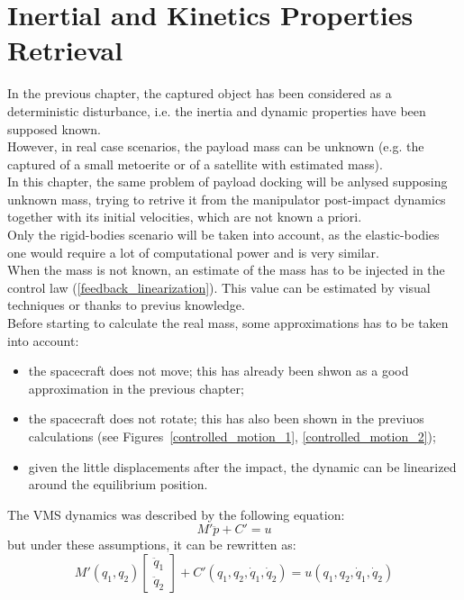 \documentclass[a4paper,12pt,oneside]{report}
\begin{document}
\chapter{Inertial and Kinetics Properties Retrieval}
In the previous chapter, the captured object has been considered as a deterministic disturbance, i.e. the inertia and dynamic properties have been supposed known.\\
However, in real case scenarios, the payload mass can be unknown (e.g. the captured of a small metoerite or of a satellite with estimated mass).\\
In this chapter, the same problem of payload docking will be anlysed supposing unknown mass, trying to retrive it from the manipulator post-impact dynamics together with its initial velocities, which are not known a priori.\\
Only the rigid-bodies scenario will be taken into account, as the elastic-bodies one would require a lot of computational power and is very similar.\\
When the mass is not known, an estimate of the mass has to be injected in the control law (\ref{feedback_linearization}). This value can be estimated by visual techniques or thanks to previus knowledge.\\
Before starting to calculate the real mass, some approximations has to be taken into account:
\begin{itemize}
  \item the spacecraft does not move; this has already been shwon as a good approximation in the previous chapter;
  \item the spacecraft does not rotate; this has also been shown in the previuos calculations (see Figures~\ref{controlled_motion_1}, \ref{controlled_motion_2});
  \item given the little displacements after the impact, the dynamic can be linearized around the equilibrium position.
\end{itemize}
The VMS dynamics was described by the following equation:
\begin{equation}
  M'\ddot{p}+C'=u
\end{equation}
but under these assumptions, it can be rewritten as:
\begin{equation}
  M'(q_1,q_2)\begin{bmatrix}
    \ddot{q}_1\\
    \ddot{q}_2
  \end{bmatrix}+C'(q_1,q_2,\dot{q}_1,\dot{q}_2)=u(q_1,q_2,\dot{q}_1,\dot{q}_2)
\end{equation}
\end{document}
